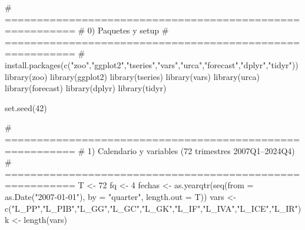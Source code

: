 \documentclass[
  spanish,
  letterpaper,
  DIV=11,
  numbers=noendperiod]{scrartcl}
\newenvironment{Shaded}{\begin{snugshade}}{\end{snugshade}}
\newcommand{\AttributeTok}[1]{\textcolor[rgb]{0.40,0.45,0.13}{#1}}
\newcommand{\CommentTok}[1]{\textcolor[rgb]{0.37,0.37,0.37}{#1}}
\newcommand{\DecValTok}[1]{\textcolor[rgb]{0.68,0.00,0.00}{#1}}
\newcommand{\FunctionTok}[1]{\textcolor[rgb]{0.28,0.35,0.67}{#1}}
\newcommand{\NormalTok}[1]{\textcolor[rgb]{0.00,0.23,0.31}{#1}}
\newcommand{\OtherTok}[1]{\textcolor[rgb]{0.00,0.23,0.31}{#1}}
\newcommand{\StringTok}[1]{\textcolor[rgb]{0.13,0.47,0.30}{#1}}
\begin{document}
\begin{Shaded}
\begin{Highlighting}[]
\CommentTok{\# =========================================================}
\CommentTok{\# 0) Paquetes y setup}
\CommentTok{\# =========================================================}
\CommentTok{\# install.packages(c("zoo","ggplot2","tseries","vars","urca","forecast","dplyr","tidyr"))}
\FunctionTok{library}\NormalTok{(zoo)}
\FunctionTok{library}\NormalTok{(ggplot2)}
\FunctionTok{library}\NormalTok{(tseries)}
\FunctionTok{library}\NormalTok{(vars)}
\FunctionTok{library}\NormalTok{(urca)}
\FunctionTok{library}\NormalTok{(forecast)}
\FunctionTok{library}\NormalTok{(dplyr)}
\FunctionTok{library}\NormalTok{(tidyr)}

\FunctionTok{set.seed}\NormalTok{(}\DecValTok{42}\NormalTok{)}

\CommentTok{\# =========================================================}
\CommentTok{\# 1) Calendario y variables (72 trimestres 2007Q1–2024Q4)}
\CommentTok{\# =========================================================}
\NormalTok{T  }\OtherTok{\textless{}{-}} \DecValTok{72}
\NormalTok{fq }\OtherTok{\textless{}{-}} \DecValTok{4}
\NormalTok{fechas }\OtherTok{\textless{}{-}} \FunctionTok{as.yearqtr}\NormalTok{(}\FunctionTok{seq}\NormalTok{(}\AttributeTok{from =} \FunctionTok{as.Date}\NormalTok{(}\StringTok{"2007{-}01{-}01"}\NormalTok{),}
                         \AttributeTok{by =} \StringTok{"quarter"}\NormalTok{, }\AttributeTok{length.out =}\NormalTok{ T))}
\NormalTok{vars }\OtherTok{\textless{}{-}} \FunctionTok{c}\NormalTok{(}\StringTok{"L\_PP"}\NormalTok{,}\StringTok{"L\_PIB"}\NormalTok{,}\StringTok{"L\_GG"}\NormalTok{,}\StringTok{"L\_GC"}\NormalTok{,}\StringTok{"L\_GK"}\NormalTok{,}\StringTok{"L\_IF"}\NormalTok{,}\StringTok{"L\_IVA"}\NormalTok{,}\StringTok{"L\_ICE"}\NormalTok{,}\StringTok{"L\_IR"}\NormalTok{)}
\NormalTok{k }\OtherTok{\textless{}{-}} \FunctionTok{length}\NormalTok{(vars)}


\end{Highlighting}
\end{Shaded}
\end{document}
